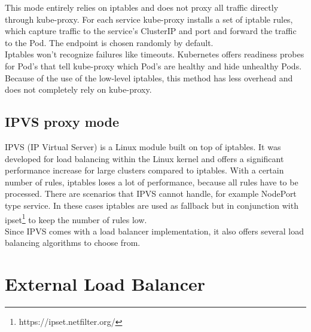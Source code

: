 This mode entirely relies on iptables and does not proxy all traffic directly through kube-proxy.
For each service kube-proxy installs a set of iptable rules, which capture traffic to the service's ClusterIP and port and forward the traffic to the Pod.
The endpoint is chosen randomly by default.
\\
Iptables won't recognize failures like timeouts.
Kubernetes offers readiness probes for Pod's that tell kube-proxy which Pod's are healthy and hide unhealthy Pods.
\\
Because of the use of the low-level iptables, this method has less overhead and does not completely rely on kube-proxy.~\cite{KUBERNETES-SERVICE}

\subsection{IPVS proxy mode}

IPVS (IP Virtual Server) is a Linux module built on top of iptables.
It was developed for load balancing within the Linux kernel and offers a significant performance increase for large clusters compared to iptables.
With a certain number of rules, iptables loses a lot of performance, because all rules have to be processed.
There are scenarios that IPVS cannot handle, for example NodePort type service.
In these cases iptables are used as fallback but in conjunction with ipset\footnote{https://ipset.netfilter.org/} to keep the number of rules low.
\\
Since IPVS comes with a load balancer implementation, it also offers several load balancing algorithms to choose from.~\cite{KUBERNETES-SERVICE}

\section{External Load Balancer}\label{sec:ExternalLoadBalancer}

